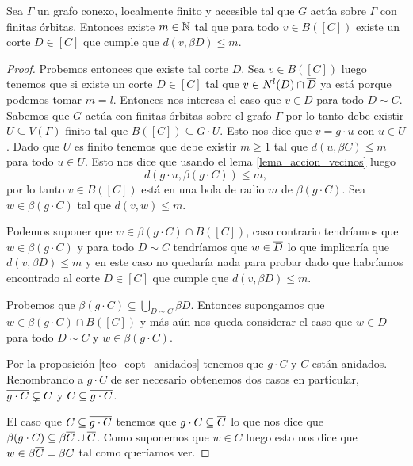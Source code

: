 \documentclass[tesis.tex]{subfiles}
\begin{document}
\begin{lema}\label{lema_existe_m_borde_corte}
	Sea $\Gamma$ un grafo conexo, localmente finito y accesible tal que $G$ actúa sobre $\Gamma$ con finitas órbitas.
	Entonces existe $m \in \mathbb{N}$ tal que para todo $v \in B([C])$ existe un corte $D \in [C]$ que cumple que
	$d(v,\beta D) \le m$.
\end{lema}
\begin{proof}
	Probemos entonces que existe tal corte $D$.
	Sea $v \in B([C])$ luego tenemos que si existe un corte $D \in [C]$ tal que  $v \in N^l(D) \cap \overline D$ ya está porque podemos tomar $m=l$.
	Entonces nos interesa el caso que $v \in D$ para todo $D \sim C$.
	Sabemos que $G$ actúa con finitas órbitas sobre el grafo $\Gamma$ por lo tanto debe existir $U \subseteq V(\Gamma)$ finito tal que $B([C]) \subseteq G \cdot U$.
	Esto nos dice que $v = g \cdot u$ con $u \in U$.
	Dado que $U$ es finito tenemos que debe existir $m \ge 1$ tal que $d(u,\beta C) \le m$ para todo $u \in U$.
	Esto nos dice que usando el lema \ref{lema_accion_vecinos} luego
	\[
	d(g \cdot u, \beta (g \cdot C)) \le m,
	\]
	por lo tanto $v \in B([C])$ está en una bola de radio $m$ de $\beta (g \cdot C)$.
	Sea $w \in \beta (g \cdot C)$ tal que $d(v,w) \le m$.
	
	Podemos suponer que $w \in \beta (g \cdot C) \cap B([C])$, caso contrario tendríamos que $w \in \beta (g \cdot C)$ y para todo $D \sim C$ tendríamos que $w \in \overline D$ lo que implicaría  que $d(v,\beta D) \le m$ y en este caso no quedaría nada para probar dado que habríamos encontrado al corte $D \in [C]$ que cumple que $d(v, \beta D) \le m$. 
	
	Probemos que $\beta (g \cdot C) \subseteq \bigcup_{D \sim C} \beta D$.
	Entonces supongamos que $w \in \beta (g \cdot C) \cap B([C])$ y más aún nos queda considerar el caso que $w \in D$ para todo $D \sim C$ y $w \in \beta (g \cdot C)$. 
	
	Por la proposición \ref{teo_copt_anidados} tenemos que $g \cdot C$ y $C$ están anidados.
	Renombrando a $g \cdot C$ de ser necesario obtenemos dos casos en particular, $\overline{ g \cdot C} \subsetneq C$ y $C \subseteq \overline {g \cdot C}$.
	
	El caso que $C \subseteq \overline{ g \cdot C}$ tenemos que $ g \cdot C \subseteq \overline C$ lo que nos dice que $\beta (g \cdot C) \subseteq \beta \overline C \cup \overline C$.
	Como suponemos que $w \in C$ luego esto nos dice que $w \in \beta \overline C = \beta C$ tal como queríamos ver.
	

\end{proof}
\end{document}
